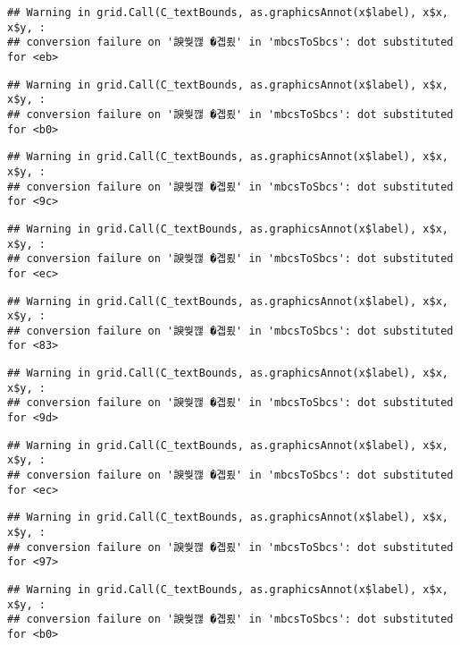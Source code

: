 \documentclass[
]{article}
\begin{document}
\begin{verbatim}
## Warning in grid.Call(C_textBounds, as.graphicsAnnot(x$label), x$x, x$y, :
## conversion failure on '諛쒖깮 �곕룄' in 'mbcsToSbcs': dot substituted for <eb>
\end{verbatim}

\begin{verbatim}
## Warning in grid.Call(C_textBounds, as.graphicsAnnot(x$label), x$x, x$y, :
## conversion failure on '諛쒖깮 �곕룄' in 'mbcsToSbcs': dot substituted for <b0>
\end{verbatim}

\begin{verbatim}
## Warning in grid.Call(C_textBounds, as.graphicsAnnot(x$label), x$x, x$y, :
## conversion failure on '諛쒖깮 �곕룄' in 'mbcsToSbcs': dot substituted for <9c>
\end{verbatim}

\begin{verbatim}
## Warning in grid.Call(C_textBounds, as.graphicsAnnot(x$label), x$x, x$y, :
## conversion failure on '諛쒖깮 �곕룄' in 'mbcsToSbcs': dot substituted for <ec>
\end{verbatim}

\begin{verbatim}
## Warning in grid.Call(C_textBounds, as.graphicsAnnot(x$label), x$x, x$y, :
## conversion failure on '諛쒖깮 �곕룄' in 'mbcsToSbcs': dot substituted for <83>
\end{verbatim}

\begin{verbatim}
## Warning in grid.Call(C_textBounds, as.graphicsAnnot(x$label), x$x, x$y, :
## conversion failure on '諛쒖깮 �곕룄' in 'mbcsToSbcs': dot substituted for <9d>
\end{verbatim}

\begin{verbatim}
## Warning in grid.Call(C_textBounds, as.graphicsAnnot(x$label), x$x, x$y, :
## conversion failure on '諛쒖깮 �곕룄' in 'mbcsToSbcs': dot substituted for <ec>
\end{verbatim}

\begin{verbatim}
## Warning in grid.Call(C_textBounds, as.graphicsAnnot(x$label), x$x, x$y, :
## conversion failure on '諛쒖깮 �곕룄' in 'mbcsToSbcs': dot substituted for <97>
\end{verbatim}

\begin{verbatim}
## Warning in grid.Call(C_textBounds, as.graphicsAnnot(x$label), x$x, x$y, :
## conversion failure on '諛쒖깮 �곕룄' in 'mbcsToSbcs': dot substituted for <b0>
\end{verbatim}
\end{document}
